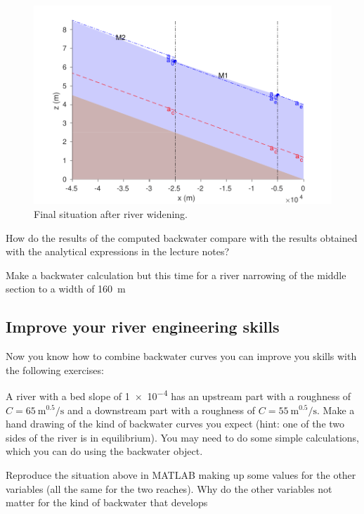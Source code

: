 \documentclass[a4paper]{article}
\begin{document}
\begin{figure}[h]
  \centering
  \includegraphics{widening_final.pdf}
  \caption{Final situation after river widening.}
  \label{fig:widening_final}
\end{figure}

\begin{exercise}
  How do the results of the computed backwater compare with the results obtained with the analytical expressions in the lecture notes?
\end{exercise}

\begin{exercise}
  Make a backwater calculation but this time for a river narrowing of the middle section to a width of \SI{160}{\m}
\end{exercise}

\subsection{Improve your river engineering skills}
Now you know how to combine backwater curves you can improve you skills with the following exercises:

\begin{exercise}
  A river with a bed slope of \num{1e-4} has an upstream part with a roughness of $C=\SI{65}{\m\tothe{0.5}\per\s}$ and a downstream part with a roughness of $C=\SI{55}{\m\tothe{0.5}\per\s}$. Make a hand drawing of the kind of backwater curves you expect (hint: one of the two sides of the river is in equilibrium). You may need to do some simple calculations, which you can do using the backwater object.
\end{exercise}

\begin{exercise}
  Reproduce the situation above in MATLAB making up some values for the other variables (all the same for the two reaches). Why do the other variables not matter for the kind of backwater that develops
\end{exercise}
\end{document}
